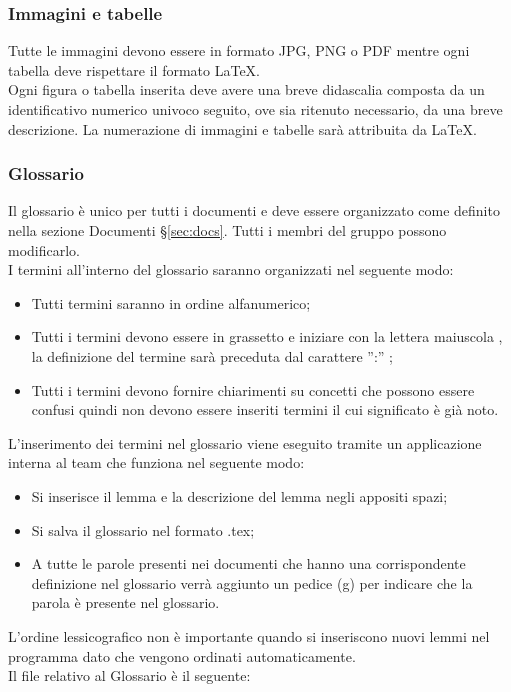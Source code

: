 {{		\subsubsection{Immagini e tabelle}{
			\label{sub:img}
			Tutte le immagini devono essere in formato JPG, PNG o PDF mentre ogni tabella deve rispettare il formato \LaTeX.\\
			Ogni figura o tabella inserita deve avere una breve didascalia composta da un identificativo numerico univoco seguito, ove sia ritenuto necessario, da una breve descrizione. La numerazione di immagini e tabelle sarà attribuita da \LaTeX.\\			
			}
		}
\subsubsection{Glossario}{
 	Il glossario è unico per tutti i documenti e deve essere organizzato come definito nella sezione Documenti \S\ref{sec:docs}. Tutti i membri del gruppo possono modificarlo.\\
 	I termini all'interno del glossario saranno organizzati nel seguente modo:
 	\begin{itemize}
	 	\item Tutti termini saranno in ordine alfanumerico;
	 	\item Tutti i termini devono essere in grassetto e iniziare con la lettera maiuscola , la definizione del termine sarà preceduta dal carattere '':'' ;
	 	\item Tutti i termini devono fornire chiarimenti su concetti che possono essere confusi quindi non devono essere inseriti termini il cui significato è già noto.
 	\end{itemize}	
      L'inserimento dei termini nel glossario viene eseguito tramite un applicazione interna al team che funziona nel seguente modo:
      \begin{itemize}
	      \item Si inserisce il lemma e la descrizione del lemma negli appositi spazi;
	      \item Si salva il glossario nel formato .tex;
	      \item A tutte le parole presenti nei documenti che hanno una corrispondente definizione nel glossario  verrà aggiunto un pedice (g) per indicare che la parola è presente nel glossario.
      \end{itemize}  
   L'ordine lessicografico non è importante quando si inseriscono nuovi lemmi nel programma dato che vengono ordinati automaticamente.\\
   Il file relativo al Glossario è il seguente: \href{run:../../Esterni/\fGlossario}{\fEscapeGlossario}
}


}
